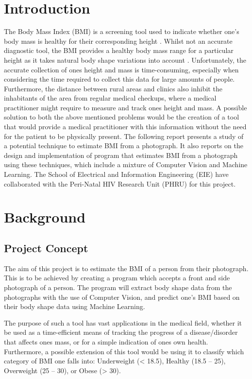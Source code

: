 \documentclass[conference]{IEEEtran}
\begin{document}
\section{Introduction}
The Body Mass Index (BMI) is a screening tool used to indicate whether one's body mass is healthy for their corresponding height \cite{nhsBMI}.
Whilst not an accurate diagnostic tool, the BMI provides a healthy body mass range for a particular height as it takes natural body shape variations into account \cite{nhsBMI}.
Unfortunately, the accurate collection of ones height and mass is time-consuming, especially when considering the time required to collect this data for large amounts of people.
Furthermore, the distance between rural areas and clinics also inhibit the inhabitants of the area from regular medical checkups, where a medical practitioner might require to measure and track ones height and mass.
A possible solution to both the above mentioned problems would be the creation of a tool that would provide a medical practitioner with this information without the need for the patient to be physically present.
The following report presents a study of a potential technique to estimate BMI from a photograph. It also reports on the design and implementation of program that estimates BMI from a photograph using these techniques, which include a mixture of Computer Vision and Machine Learning.
The School of Electrical and Information Engineering (EIE) have collaborated with the Peri-Natal HIV Research Unit (PHRU) for this project.
\section{Background}
\subsection{Project Concept} \label{concept}
The aim of this project is to estimate the BMI of a person from their photograph.
This is to be achieved by creating a program which accepts a front and side photograph of a person.
The program will extract body shape data from the photographs with the use of Computer Vision, and predict one's BMI based on their body shape data using Machine Learning.

The purpose of such a tool has vast applications in the medical field, whether it be used as a time-efficient means of tracking the progress of a disease/disorder that affects ones mass, or for a simple indication of ones own health.
Furthermore, a possible extension of this tool would be using it to classify which category of BMI one falls into: Underweight (< 18.5), Healthy (18.5 -- 25), Overweight (25 -- 30), or Obese (> 30).
\end{document}
